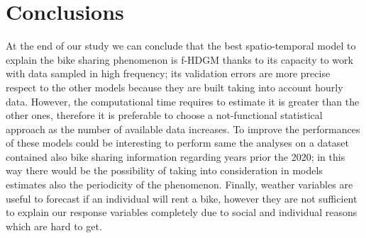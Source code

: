 \section{Conclusions}

At the end of our study we can conclude that the best spatio-temporal model to explain the bike sharing phenomenon is f-HDGM thanks to its capacity to work with data sampled in high frequency; its validation errors are more precise respect to the other models because they are built taking into account hourly data. However, the computational time requires to estimate it is greater than the other ones, therefore it is preferable to choose a not-functional statistical approach as the number of available data increases. To improve the performances of these models could be interesting to perform same the analyses on a dataset contained also bike sharing information regarding years prior the \num{2020}; in this way there would be the possibility of taking into consideration in models estimates also the periodicity of the phenomenon. Finally, weather variables are useful to forecast if  an individual will rent a bike, however they are not sufficient to explain our response variables completely due to social and individual reasons which are hard to get. 